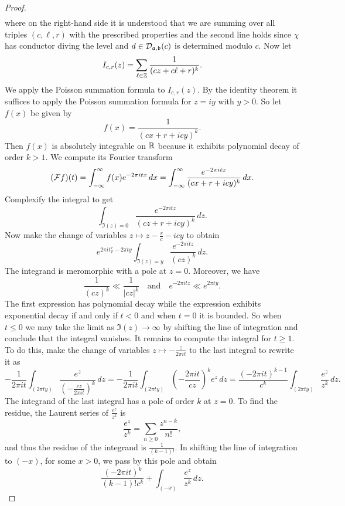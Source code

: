 \begin{proof}
\begin{align*}
      \end{align*}
      where on the right-hand side it is understood that we are summing over all triples $(c,\ell,r)$ with the prescribed properties and the second line holds since $\chi$ has conductor diving the level and $d \in \mathcal{D}_{\mathfrak{a},\mathfrak{b}}(c)$ is determined modulo $c$. Now let
      \[
        I_{c,r}(z) = \sum_{\ell \in \mathbb{Z}}\frac{1}{(cz+c\ell+r)^{k}}.
      \]
      We apply the Poisson summation formula to $I_{c,r}(z)$. By the identity theorem it suffices to apply the Poisson summation formula for $z = iy$ with $y > 0$. So let $f(x)$ be given by
      \[
        f(x) = \frac{1}{(cx+r+icy)^{k}}.
      \]
      Then $f(x)$ is absolutely integrable on $\mathbb{R}$ because it exhibits polynomial decay of order $k > 1$. We compute its Fourier transform
      \[
        (\mathcal{F}f)(t) = \int_{-\infty}^{\infty}f(x)e^{-2\pi itx}\,dx = \int_{-\infty}^{\infty}\frac{e^{-2\pi itx}}{(cx+r+icy)^{k}}\,dx.
      \]
      Complexify the integral to get
      \[
        \int_{\Im(z) = 0}\frac{e^{-2\pi itz}}{(cz+r+icy)^{k}}\,dz.
      \]
      Now make the change of variables $z \mapsto z-\frac{r}{c}-icy$ to obtain
      \[
        e^{2\pi it\frac{r}{c}-2\pi ty}\int_{\Im(z) = y}\frac{e^{-2\pi itz}}{(cz)^{k}}\,dz.
      \]
      The integrand is meromorphic with a pole at $z = 0$. Moreover, we have
      \[
        \frac{1}{(cz)^{k}} \ll \frac{1}{|cz|^{k}} \quad \text{and} \quad e^{-2\pi itz} \ll e^{2\pi ty}.
      \]
      The first expression has polynomial decay while the expression exhibits exponential decay if and only if $t < 0$ and when $t = 0$ it is bounded. So when $t \le 0$ we may take the limit as $\Im(z) \to \infty$ by shifting the line of integration and conclude that the integral vanishes. It remains to compute the integral for $t \ge 1$. To do this, make the change of variables $z \mapsto -\frac{z}{2\pi it}$ to the last integral to rewrite it as
      \[
        -\frac{1}{2\pi it}\int_{(2\pi ty)}\frac{e^{z}}{\left(-\frac{cz}{2\pi it}\right)^{k}}\,dz = -\frac{1}{2\pi it}\int_{(2\pi ty)}\left(-\frac{2\pi it}{cz}\right)^{k}e^{z}\,dz = \frac{(-2\pi it)^{k-1}}{c^{k}}\int_{(2\pi ty)}\frac{e^{z}}{z^{k}}\,dz.
      \]
      The integrand of the last integral has a pole of order $k$ at $z = 0$. To find the residue, the Laurent series of $\frac{e^{z}}{z^{k}}$ is
      \[
        \frac{e^{z}}{z^{k}} = \sum_{n \ge 0}\frac{z^{n-k}}{n!},
      \]
      and thus the residue of the integrand is $\frac{1}{(k-1)!}$. In shifting the line of integration to $(-x)$, for some $x > 0$, we pass by this pole and obtain
      \[
        \frac{(-2\pi it)^{k}}{(k-1)!c^{k}}+\int_{(-x)}\frac{e^{z}}{z^{k}}\,dz.
\]
\end{proof}
